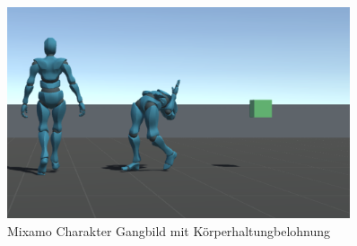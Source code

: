 \begin{figure}[H]
  \centering  
  \includegraphics[width=0.9\textwidth]{img/charakter_mixamo_imitation}
  \caption{Mixamo Charakter Gangbild mit Körperhaltungbelohnung}
  \label{fig:charakter_mixamo_imitation}
\end{figure}